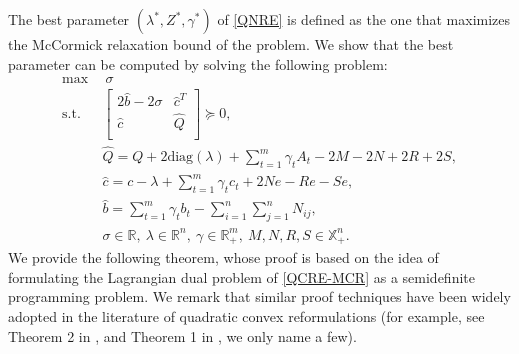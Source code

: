 \documentclass[pdflatex,sn-mathphys-num]{sn-jnl}%
\theoremstyle{thmstyleone}%
\theoremstyle{thmstyletwo}%
\theoremstyle{thmstylethree}%
\begin{document}
The best parameter $(\lambda^\ast,Z^\ast,\gamma^\ast)$ of \eqref{QNRE} is defined as the one that maximizes the McCormick relaxation bound of the problem. We show that the best parameter can be computed by solving the following problem:
\begin{equation}\label{QNR-dual1}
	\begin{aligned}
		\max ~&~ \sigma \\
		\mbox{s.t.} ~&\begin{bmatrix}
			2\hat{b}-2\sigma &\hat{c}^T\\
			\hat{c} ~&\hat{Q} \\
		\end{bmatrix}\succeq 0,\\
		&\hat{Q}=Q+2\textrm{diag}(\lambda)+\sum_{t=1}^m\gamma_t A_t-2M-2N+2R+2S,\\
		&\hat{c}=c-\lambda+\sum_{t=1}^m \gamma_t c_t+2Ne-Re-Se,\\
		&\hat{b}=\sum_{t=1}^m \gamma_t b_t-\sum_{i=1}^n\sum_{j=1}^n N_{ij},\\
		&\sigma\in\mathbb{R},~\lambda\in\mathbb{R}^n,~\gamma\in\mathbb{R}^m_+,~M,N,R,S\in\mathbb{X}_+^n.
	\end{aligned}
\end{equation}
We provide the following theorem, whose proof is based on the idea of formulating the Lagrangian dual problem of \eqref{QCRE-MCR} as a semidefinite programming problem. We remark that similar proof techniques have been widely adopted in the literature of quadratic convex reformulations (for example, see Theorem 2 in \cite{Billionnet2012}, and Theorem 1 in \cite{Billionnet2013}, we only name a few).
\end{document}
